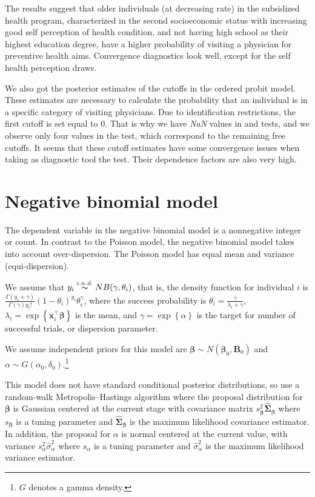 The results suggest that older individuals (at decreasing rate) in the subsidized health program, characterized in the second socioeconomic status with increasing good self perception of health condition, and not having high school as their highest education degree, have a higher probability of visiting a physician for preventive health aims. Convergence diagnostics look well, except for the self health perception draws.

We also got the posterior estimates of the cutoffs in the ordered probit model.
These estimates are necessary to calculate the probability that an individual is in a specific category of visiting physicians. Due to identification restrictions, the first cutoff is set equal to 0. That is why we have \textit{NaN} values in \cite{Geweke1992} and \cite{Heidelberger1983} tests, and we observe only four values in the \cite{Raftery1992} test, which correspond to the remaining free cutoffs. It seems that these cutoff estimates have some convergence issues when taking as diagnostic tool the \cite{Raftery1992} test.
Their dependence factors are also very high.

\section{Negative binomial model}\label{sec67}

The dependent variable in the negative binomial model is a nonnegative integer or count. In contrast to the Poisson model, the negative binomial model takes into account over-dispersion. The Poisson model has equal mean and variance (equi-dispersion).

We assume that $y_i\stackrel{i.n.d.} {\thicksim}NB(\gamma,\theta_i)$, that is, the density function for individual $i$ is $\frac{\Gamma(y_i+\gamma)}{\Gamma(\gamma)y_i!}(1-\theta_i)^{y_i}\theta_i^{\gamma}$, where the success probability is $\theta_i=\frac{\gamma}{\lambda_i+\gamma}$, $\lambda_i=\exp\left\{\bm{x}_i^{\top}\bm{\beta}\right\}$ is the mean, and $\gamma=\exp\left\{\alpha \right\}$ is the target for number of successful trials, or dispersion parameter.

We assume independent priors for this model are $\bm{\beta} \sim N(\bm{\beta}_0,\bm{B}_0)$ and 
$\alpha \sim G(\alpha_0, \delta_0)$.\footnote{$G$ denotes a gamma density.}

This model does not have standard conditional posterior distributions, so \cite{rossi2012bayesian} use a random-walk Metropolis--Hastings algorithm where the proposal distribution for $\bm{\beta}$ is Gaussian centered at the current stage with covariance matrix $s_{\bm{\beta}}^2\hat{\bm{\Sigma}}_{\bm{\beta}}$ where $s_{\bm{\beta}}$ is a tuning parameter and $\hat{\bm{\Sigma}}_{\bm{\beta}}$ is the maximum likelihood covariance estimator. In addition, the proposal for $\alpha$ is normal centered at the current value, with variance $s_{\alpha}^2\hat{\sigma}_{\alpha}^2$ where $s_{\alpha}$ is a tuning parameter and $\hat{\sigma}_{\alpha}^2$ is the maximum likelihood variance estimator.\\


